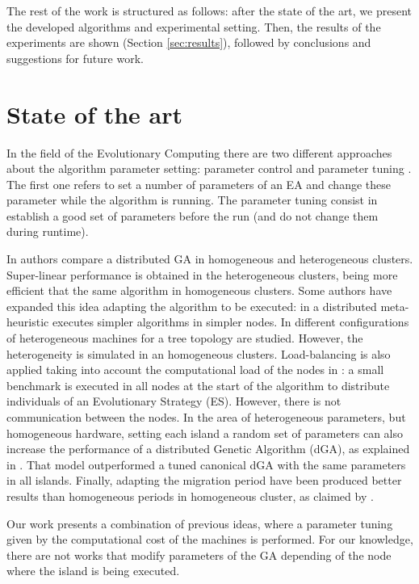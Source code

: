 \documentclass{sig-alternate}
\begin{document}
The rest of the work is structured as follows: after the state of
the art, we present the developed algorithms and experimental setting. 
Then, the results of the experiments are shown (Section \ref{sec:results}), followed by conclusions and suggestions for future work.


%
\section{State of the art}
\label{sec:soa}
%

In the field of the Evolutionary Computing there are two different approaches about the algorithm parameter setting: parameter control and parameter tuning \cite{PARAMETERTUNING}. The first one refers to set a number of parameters of an EA and change these parameter while the algorithm is running. The parameter tuning consist in establish a good set of parameters before the run (and do not change them during runtime).

 In \cite{HETEROGENEOUSHARD} authors compare a distributed GA in homogeneous and heterogeneous clusters. Super-linear performance is obtained in the heterogeneous clusters, being more efficient that the same algorithm in homogeneous clusters. Some authors have expanded this idea adapting the algorithm to be executed: in \cite{HYDROCM} a distributed meta-heuristic executes simpler algorithms in simpler nodes. In \cite{HETEROGENEOUSTOPOLOGY} different configurations of heterogeneous machines for a tree topology are studied. However, the heterogeneity is simulated in an homogeneous clusters. Load-balancing is also applied taking into account the computational load of the nodes in \cite{PARALLELIMPLEMENTATION}: a small benchmark is executed in all nodes at the start of the algorithm to distribute individuals of an Evolutionary Strategy (ES). However, there is not communication between the nodes. In the area of heterogeneous parameters, but homogeneous hardware, setting each island a random set of parameters can also increase the performance of a distributed Genetic Algorithm (dGA), as explained in \cite{HETEROGENEOUSPARAMETERS}. That model outperformed a tuned canonical dGA with the same parameters in all islands. Finally, adapting the migration period have been produced better results than homogeneous periods in homogeneous cluster, as claimed by \cite{HETEROGENEOUSMIGRATION}.

 Our work presents a combination of previous ideas, where a parameter tuning given by the computational cost of the machines is performed. For our knowledge, there are not works that modify parameters of the GA depending of the node where the island is being executed.
\end{document}
